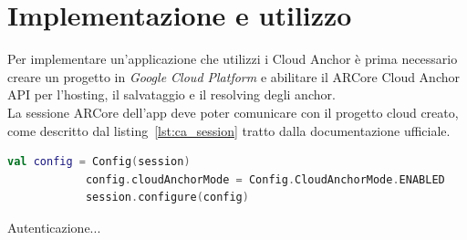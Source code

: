 \documentclass[crop=false, class=book]{standalone}
\begin{document}
	\section{Implementazione e utilizzo}
	Per implementare un'applicazione che utilizzi i Cloud Anchor è prima necessario creare un progetto in \textit{Google Cloud Platform} e abilitare il ARCore Cloud Anchor API per l'hosting, il salvataggio e il resolving degli anchor.
	\\
	\noindent
	La sessione ARCore dell'app deve poter comunicare con il progetto cloud creato, come descritto dal listing~\vref{lst:ca_session} tratto dalla documentazione ufficiale.
	\begin{center}
		\begin{minipage}{0.95\textwidth}
			\begin{lstlisting}[caption={Configurazione della modalità Cloud Anchor.}, label={lst:ca_session}, language=Kotlin]
			val config = Config(session)
			config.cloudAnchorMode = Config.CloudAnchorMode.ENABLED
			session.configure(config)
			\end{lstlisting}
		\end{minipage}
	\end{center}

	Autenticazione...
\end{document}

